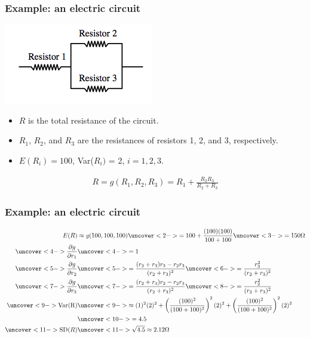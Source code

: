 \documentclass[handout]{beamer}\usepackage{graphicx, color}
\numberwithin{equation}{section}
\begin{document}
\begin{frame}
\frametitle{Example: an electric circuit}
\begin{center}
 \includegraphics{../../fig/resist.png}
\end{center}
\begin{itemize}
\pause \item $R$ is the total resistance of the circuit.
\pause \item $R_1$, $R_2$, and $R_3$ are the resistances of resistors 1, 2, and 3, respectively.
\pause \item $E(R_i) = 100$, Var($R_i)$ = 2, $i = 1,2,3$. 
\end{itemize}
\pause \begin{align*}
R = g(R_1, R_2, R_3) = R_1 + \frac{R_2 R_3}{R_2 + R_3}
\end{align*}
\end{frame}

\begin{frame}
\frametitle{Example: an electric circuit} \scriptsize
\begin{align*}
E(R) &\approx g(100, 100, 100) \uncover<2->{= 100 + \frac{(100)(100)}{100 + 100}} \uncover<3->{= 150 \Omega} \\
\uncover<4->{\frac{\partial g}{\partial r_1}} & \uncover<4->{= 1} \\
\uncover<5->{\frac{\partial g}{\partial r_2}} & \uncover<5->{= \frac{(r_2 + r_3)r_3 - r_2r_3}{(r_2 + r_3)^2}}\uncover<6->{ = \frac{r_3^2}{(r_2 + r_3)^2}} \\
\uncover<7->{\frac{\partial g}{\partial r_3}} & \uncover<7->{= \frac{(r_2 + r_3)r_2 - r_2 r_3}{(r_2 + r_3)^2}} \uncover<8->{ = \frac{r_2^2}{(r_2 + r_3)^2}} \\
\uncover<9->{\text{Var(R)}} &\uncover<9->{ \approx (1)^2 (2)^2 + \left ( \frac{(100)^2}{(100 + 100)^2} \right ) ^2 (2)^2 + \left (\frac{(100)^2}{(100 + 100)^2} \right ) ^2 (2)^2 } \\
&\uncover<10->{= 4.5} \\
\uncover<11->{\text{SD}(R)} &\uncover<11->{\sqrt{4.5} \approx 2.12 \Omega}
\end{align*}
\end{frame}
\end{document}
